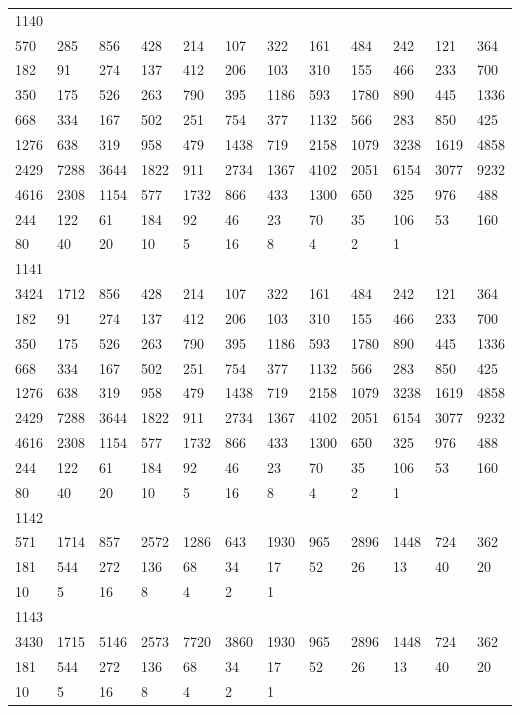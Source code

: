 \begin{longtable}{llllllllllll}
1140&&&&&&&&&&&\\
570& 285& 856& 428& 214& 107& 322& 161& 484& 242& 121& 364\\
182& 91& 274& 137& 412& 206& 103& 310& 155& 466& 233& 700\\
350& 175& 526& 263& 790& 395& 1186& 593& 1780& 890& 445& 1336\\
668& 334& 167& 502& 251& 754& 377& 1132& 566& 283& 850& 425\\
1276& 638& 319& 958& 479& 1438& 719& 2158& 1079& 3238& 1619& 4858\\
2429& 7288& 3644& 1822& 911& 2734& 1367& 4102& 2051& 6154& 3077& 9232\\
4616& 2308& 1154& 577& 1732& 866& 433& 1300& 650& 325& 976& 488\\
244& 122& 61& 184& 92& 46& 23& 70& 35& 106& 53& 160\\
80& 40& 20& 10& 5& 16& 8& 4& 2& 1& \\

1141&&&&&&&&&&&\\
3424& 1712& 856& 428& 214& 107& 322& 161& 484& 242& 121& 364\\
182& 91& 274& 137& 412& 206& 103& 310& 155& 466& 233& 700\\
350& 175& 526& 263& 790& 395& 1186& 593& 1780& 890& 445& 1336\\
668& 334& 167& 502& 251& 754& 377& 1132& 566& 283& 850& 425\\
1276& 638& 319& 958& 479& 1438& 719& 2158& 1079& 3238& 1619& 4858\\
2429& 7288& 3644& 1822& 911& 2734& 1367& 4102& 2051& 6154& 3077& 9232\\
4616& 2308& 1154& 577& 1732& 866& 433& 1300& 650& 325& 976& 488\\
244& 122& 61& 184& 92& 46& 23& 70& 35& 106& 53& 160\\
80& 40& 20& 10& 5& 16& 8& 4& 2& 1& \\

1142&&&&&&&&&&&\\
571& 1714& 857& 2572& 1286& 643& 1930& 965& 2896& 1448& 724& 362\\
181& 544& 272& 136& 68& 34& 17& 52& 26& 13& 40& 20\\
10& 5& 16& 8& 4& 2& 1& \\

1143&&&&&&&&&&&\\
3430& 1715& 5146& 2573& 7720& 3860& 1930& 965& 2896& 1448& 724& 362\\
181& 544& 272& 136& 68& 34& 17& 52& 26& 13& 40& 20\\
10& 5& 16& 8& 4& 2& 1& \\


\end{longtable}
